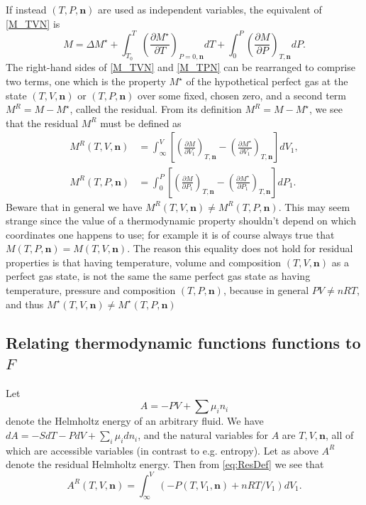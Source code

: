\documentclass[english]{../thermomemo/thermomemo}
\newcommand{\dd}[2]{\frac{\partial #1}{\partial #2}}
\newcommand{\mbn}[0]{\mathbf n}
\newcommand{\lp}{\left(}
\newcommand{\rp}{\right)}
\numberwithin{equation}{section}
\begin{document}
If instead $(T,P,\mbn)$ are used as independent variables, the
equivalent of \eqref{M_TVN} is
\begin{equation}
  \label{M_TPN}
  M = \Delta M^\star + \int_{T_0}^T \lp \frac{\partial M^\star}{\partial
    T} \rp_{P=0,\mbn} dT + \int_{0}^P \lp \frac{\partial M}{\partial P}
  \rp_{T,\mbn} dP.
\end{equation}
The right-hand sides of \eqref{M_TVN} and \eqref{M_TPN} can be
rearranged to comprise two terms, one which is the property $M^\star$
of the hypothetical perfect gas at the state $(T,V,\mbn)$ or
$(T,P,\mbn)$ over some fixed, chosen zero, and a second term $M^R = M
- M^\star$, called the residual. From its definition $M^R = M -
M^\star$, we see that the residual $M^R$ must be defined as
\begin{equation}
  \label{eq:ResDef}
  \begin{aligned}
    M^R(T,V,\mbn) &= \int_\infty^V \left[ \lp \dd{M}{V_1} \rp_{T,\mbn} -
      \lp \dd{M^\star}{V_1} \rp_{T,\mbn} \right] dV_1, \\
    M^R(T,P,\mbn) &= \int_0^P \left[ \lp \dd{M}{P_1} \rp_{T,\mbn} - \lp
      \dd{M^\star}{P_1} \rp_{T,\mbn} \right] dP_1.
  \end{aligned}
\end{equation}
Beware that in general we have $M^R(T,V,\mbn) \neq
M^R(T,P,\mbn)$. This may seem strange since the value of a
thermodynamic property shouldn't depend on which coordinates one
happens to use; for example it is of course always true that
$M(T,P,\mbn) = M(T,V,\mbn)$. The reason this equality does not hold
for residual properties is that having temperature, volume and
composition $(T,V,\mbn)$ as a perfect gas state, is not the same the
same perfect gas state as having temperature, pressure and composition
$(T,P,\mbn)$, because in general $PV \neq nRT$, and thus $M^\star(T,V,\mbn) \neq
M^\star(T,P,\mbn)$

\subsection{Relating thermodynamic functions functions to $F$}
Let
$$
A = -PV + \sum \mu_i n_i
$$
denote the Helmholtz energy of an arbitrary fluid. We have $dA =
-SdT-PdV + \sum_i \mu_i dn_i$, and the natural variables for $A$ are
$T, V, \mbn$, all of which are accessible variables (in contrast to
e.g. entropy). Let as above $A^R$ denote the residual Helmholtz
energy. Then from \eqref{eq:ResDef} we see that
\begin{equation}
  \label{eq:1}
  A^R(T,V,\mbn) = \int_\infty^V \lp -P(T,V_1,\mbn) + nRT/V_1 \rp dV_1.
\end{equation}
\end{document}
